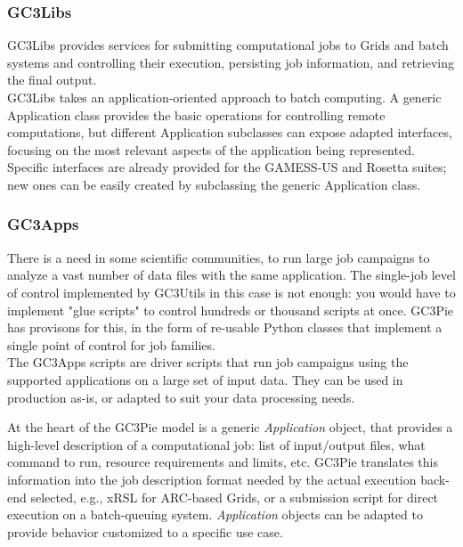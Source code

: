 \documentclass{PoS}
\begin{document}
\subsubsection*{GC3Libs}

GC3Libs provides services for submitting computational jobs to Grids and batch systems and controlling their execution, persisting job information, and retrieving the final output. \\

GC3Libs takes an application-oriented approach to batch computing. A generic Application class provides the basic operations for controlling remote computations, but different Application subclasses can expose adapted interfaces, focusing on the most relevant aspects of the application being represented. Specific interfaces are already provided for the GAMESS-US and Rosetta suites; new ones can be easily created by subclassing the generic Application class. \\

\subsubsection*{GC3Apps}

There is a need in some scientific communities, to run large job campaigns to analyze a vast number of data files with the same application. The single-job level of control implemented by GC3Utils in this case is not enough: you would have to implement "glue scripts" to control hundreds or thousand scripts at once. GC3Pie has provisons for this, in the form of re-usable Python classes that implement a single point of control for job families. \\

The GC3Apps scripts are driver scripts that run job campaigns using the supported applications on a large set of input data. They can be used in production as-is, or adapted to suit your data processing needs. 


At the heart of the GC3Pie model is a generic \emph{Application}
object, that provides a high-level description of a computational
job: list of input/output files, what command to run, resource
requirements and limits, etc. GC3Pie translates this information into
the job description format needed by the actual execution back-end
selected, e.g., \acs{xRSL} for ARC-based Grids, or a submission script for
direct execution on a batch-queuing system. \emph{Application} objects
can be adapted to provide behavior customized to a specific use case.
\end{document}
